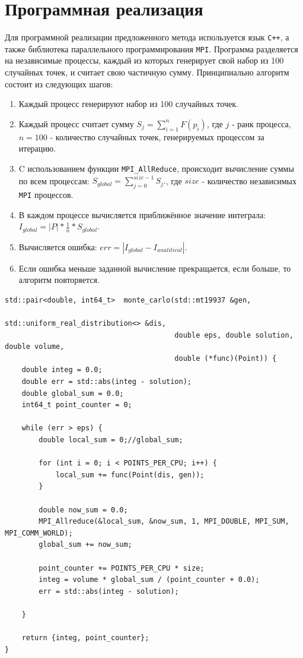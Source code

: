 \documentclass{article}
\begin{document}
\section{Программная реализация}
    Для программной реализации предложенного метода используется язык {\tt C++}, а также 
    библиотека параллельного программирования {\tt MPI}.
    Программа разделяется на независимые процессы, каждый из которых генерирует свой набор 
    из 100 случайных точек, и считает свою частичную сумму.
    Принципиально алгоритм состоит из следующих шагов:
    \begin{enumerate}
        \item Каждый процесс генерируют набор из 100 случайных точек.
        \item Каждый процесс считает сумму \(S_j = \sum_{i=1}^{n} F(p_i)\), 
            где \(j\) - ранк процесса, \(n = 100\) - количество случайных точек, 
            генерируемых процессом за итерацию.
        \item C использованием функции {\tt MPI\_AllReduce}, 
            происходит вычисление суммы по всем процессам: 
            \(S_{global} = \sum_{j = 0}^{size - 1} S_j.\),
            где \(size\) - количество независимых {\tt MPI} процессов.
        \item В каждом процессе вычисляется приближённое значение интеграла:
            \(I_{global} = |P| * \frac{1}{n} * S_{global}\).
        \item Вычисляется ошибка: \(err = |I_{global} - I_{analitical}|\).
        \item Если ошибка меньше заданной вычисление прекращается, если больше,
            то алгоритм повторяется.
    \end{enumerate}
\begin{lstlisting}
std::pair<double, int64_t>  monte_carlo(std::mt19937 &gen, 
                                        std::uniform_real_distribution<> &dis, 
                                        double eps, double solution, double volume, 
                                        double (*func)(Point)) {
    double integ = 0.0;
    double err = std::abs(integ - solution);
    double global_sum = 0.0;
    int64_t point_counter = 0;

    while (err > eps) {
        double local_sum = 0;//global_sum;
        
        for (int i = 0; i < POINTS_PER_CPU; i++) {
            local_sum += func(Point(dis, gen));
        }
        
        double now_sum = 0.0;
        MPI_Allreduce(&local_sum, &now_sum, 1, MPI_DOUBLE, MPI_SUM, MPI_COMM_WORLD);
        global_sum += now_sum;
        
        point_counter += POINTS_PER_CPU * size;
        integ = volume * global_sum / (point_counter + 0.0);
        err = std::abs(integ - solution);
    
    }

    return {integ, point_counter}; 
}
\end{lstlisting}
\end{document}
